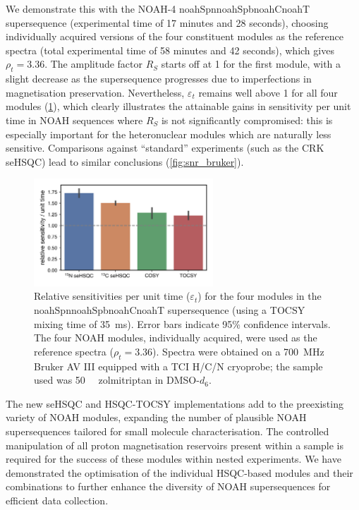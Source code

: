 \documentclass[11pt]{article}
\newcommand*{\noahfour}[4]{\csname noah#1\endcsname\csname noah#2\endcsname\csname noah#3\endcsname\csname noah#4\endcsname}
\newcommand*{\zolmi}{Spectra were obtained on a \SI{700}{\MHz} Bruker AV III equipped with a TCI H/C/N cryoprobe; the sample used was \SI{50}{\milli\molar} zolmitriptan in DMSO-$d_6$.}
\begin{document}
\begin{refsection}
We demonstrate this with the NOAH-4 \noahfour{Spn}{Spb}{C}{T} supersequence (experimental time of 17 minutes and 28 seconds), choosing individually acquired versions of the four constituent modules as the reference spectra (total experimental time of 58 minutes and 42 seconds), which gives $\rho_t = 3.36$.
The amplitude factor $R_S$ starts off at 1 for the first module, with a slight decrease as the supersequence progresses due to imperfections in magnetisation preservation.
Nevertheless, $\varepsilon_t$ remains well above 1 for all four modules (\cref{fig:snr_modules}), which clearly illustrates the attainable gains in sensitivity per unit time in NOAH sequences where $R_S$ is not significantly compromised: this is especially important for the heteronuclear modules which are naturally less sensitive.
Comparisons against ``standard'' experiments (such as the CRK seHSQC) lead to similar conclusions (\cref{fig:snr_bruker}).

\begin{figure}
    \centering
    \includegraphics[width=0.6\textwidth]{snr_modules.png}
    \caption{
        Relative sensitivities per unit time ($\varepsilon_t$) for the four modules in the \noahfour{Spn}{Spb}{C}{T} supersequence (using a TOCSY mixing time of \SI{35}{\ms}).
        Error bars indicate 95\% confidence intervals.
        The four NOAH modules, individually acquired, were used as the reference spectra ($\rho_t = 3.36$).
        \zolmi{}
    }
    \label{fig:snr_modules}
\end{figure}


The new seHSQC and HSQC-TOCSY implementations add to the preexisting variety of NOAH modules, expanding the number of plausible NOAH supersequences tailored for small molecule characterisation.
The controlled manipulation of all proton magnetisation reservoirs present within a sample is required for the success of these modules within nested experiments.
We have demonstrated the optimisation of the individual HSQC-based modules and their combinations to further enhance the diversity of NOAH supersequences for efficient data collection.


\end{refsection}
\end{document}
